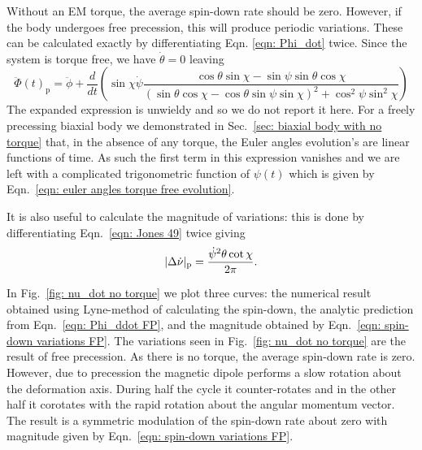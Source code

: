 \documentclass[../full_thesis/full_thesis.tex]{subfiles}
\begin{document}
Without an EM torque, the average spin-down rate should be zero. However, if
the body undergoes free precession, this will produce periodic variations.
These can be calculated exactly by differentiating Eqn. \eqref{eqn: Phi_dot}
twice. Since the system is torque free, we have $\dot{\theta} = 0$ leaving
\begin{equation}
    \ddot{\Phi}(t)_{\mathrm{p}} = \ddot{\phi} + \frac{d}{dt}\left(
        \sin\chi\dot{\psi} \frac{\cos\theta\sin\chi - \sin \psi \sin \theta \cos\chi
}{(\sin\theta \cos \chi - \cos \theta \sin \psi \sin \chi)^{2} + \cos^{2}\psi \sin^{2} \chi}
\right)
\label{eqn: Phi_ddot FP}
\end{equation}
The expanded expression is unwieldy and so we do not report it here. For a
freely precessing biaxial body we demonstrated in Sec.~\ref{sec: biaxial body
with no torque} that, in the absence of any torque, the Euler angles evolution's
are linear functions of time. As such the first term in this expression
vanishes and we are left with a complicated trigonometric function of $\psi(t)$
which is given by Eqn.~\eqref{eqn: euler angles torque free evolution}.

It is also useful to calculate the magnitude of variations: this is done by
differentiating Eqn.~\eqref{eqn: Jones 49} twice giving
\begin{equation}
    |\Delta\dot{\nu}|_{\mathrm{p}} =\frac{\dot{\psi}^{2} \theta \cot\chi}{2\pi}.
    \label{eqn: spin-down variations FP}
\end{equation}

In Fig.~\ref{fig: nu_dot no torque} we plot three curves: the numerical
result obtained using Lyne-method of calculating the spin-down, the analytic
prediction from Eqn.~\eqref{eqn: Phi_ddot FP}, and the magnitude obtained by
Eqn.~\eqref{eqn: spin-down variations FP}.
The variations seen in Fig.~\ref{fig: nu_dot no torque} are the result of
free precession. As there is no torque, the average spin-down rate is zero. However,
due to precession the magnetic dipole performs a slow rotation about the
deformation axis. During half the cycle it counter-rotates and in the other
half it corotates with the rapid rotation about the angular momentum vector.
The result is a symmetric modulation of the spin-down rate about zero with magnitude
given by Eqn.~\eqref{eqn: spin-down variations FP}.
\end{document}
